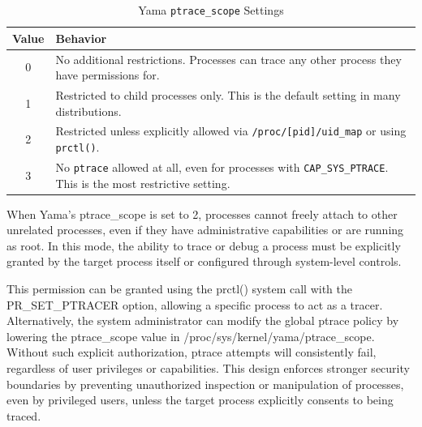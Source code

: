 \documentclass[12pt]{report}
\begin{document}
\begin{doublespace}
\begin{table}[h]
    \centering
    \caption{Yama \texttt{ptrace\_scope} Settings}
    \label{tab:yama-settings}
    \begin{tabular}{|c|p{10cm}|}
        \hline
        \textbf{Value} & \textbf{Behavior} \\
        \hline
        0 & No additional restrictions. Processes can trace any other process they have permissions for. \\
        \hline
        1 & Restricted to child processes only. This is the default setting in many distributions. \\
        \hline
        2 & Restricted unless explicitly allowed via \texttt{/proc/[pid]/uid\_map} or using \texttt{prctl()}. \\
        \hline
        3 & No \texttt{ptrace} allowed at all, even for processes with \texttt{CAP\_SYS\_PTRACE}. This is the most restrictive setting. \\
        \hline
    \end{tabular}
\end{table}

When Yama’s ptrace\_scope is set to 2, processes cannot freely attach to other unrelated processes, even if they have administrative capabilities or are running as root. In this mode, the ability to trace or debug a process must be explicitly granted by the target process itself or configured through system-level controls.

This permission can be granted using the prctl() system call with the PR\_SET\_PTRACER option, allowing a specific process to act as a tracer. Alternatively, the system administrator can modify the global ptrace policy by lowering the ptrace\_scope value in /proc/sys/kernel/yama/ptrace\_scope. Without such explicit authorization, ptrace attempts will consistently fail, regardless of user privileges or capabilities. This design enforces stronger security boundaries by preventing unauthorized inspection or manipulation of processes, even by privileged users, unless the target process explicitly consents to being traced.

\end{doublespace} \fontsize{12pt}{14pt} \selectfont
\end{document}
